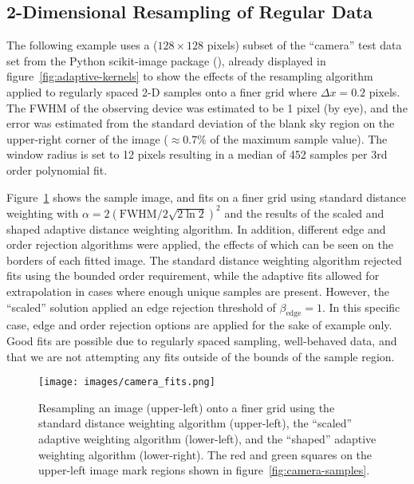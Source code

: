 \subsection{2-Dimensional Resampling of Regular Data}
\label{subsec:example-2d}

The following example uses a ($128 \times 128$ pixels) subset of the ``camera''
test data set from the Python scikit-image package (\citet{skimage2014}),
already displayed in figure~\ref{fig:adaptive-kernels} to show the effects of
the resampling algorithm applied to regularly spaced 2-D samples onto a finer
grid where $\Delta x = 0.2$ pixels.
The FWHM of the observing device was estimated to be 1 pixel (by eye), and the
error was estimated from the standard deviation of the blank sky region on the
upper-right corner of the image ($\approx 0.7\%$ of the maximum sample value).
The window radius is set to 12 pixels resulting in a median of 452 samples
per 3rd order polynomial fit.

Figure~\ref{fig:camera-fits} shows the sample image, and fits on a finer grid
using standard distance weighting with
$\alpha = 2 \left(\text{FWHM} / 2\sqrt{2 \ln 2}\right)^2$ and the results of
the scaled and shaped adaptive distance weighting algorithm.
In addition, different edge and order rejection algorithms were applied, the
effects of which can be seen on the borders of each fitted image.
The standard distance weighting algorithm rejected fits using the bounded
order requirement, while the adaptive fits allowed for extrapolation in cases
where enough unique samples are present.
However, the ``scaled'' solution applied an edge rejection threshold of
$\beta_{\text{edge}} = 1$.
In this specific case, edge and order rejection options are applied for the sake
of example only.
Good fits are possible due to regularly spaced sampling, well-behaved data,
and that we are not attempting any fits outside of the bounds of the sample
region.

\begin{figure}[H]
  \begin{center}
  \texttt{[image: images/camera\_fits.png]}
  \caption{Resampling an image (upper-left) onto a finer grid using the
           standard distance weighting algorithm (upper-left), the ``scaled''
           adaptive weighting algorithm (lower-left), and the ``shaped''
           adaptive weighting algorithm (lower-right).  The red and green
           squares on the upper-left image mark regions shown in
           figure~\ref{fig:camera-samples}.}
  \label{fig:camera-fits}
  \end{center}
\end{figure}

